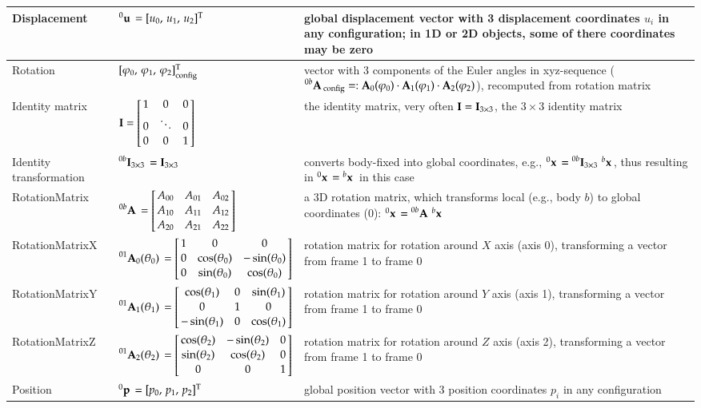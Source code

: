 \begin{center}
\begin{longtable}{| p{5cm} | p{5cm} | p{6cm} |}
    Displacement & $\prescript{0}{}{\mathbf{u}}\, = [u_0,\, u_1,\, u_2]^\mathrm{T}$ & global displacement vector with 3 displacement coordinates $u_i$ in any configuration; in 1D or 2D objects, some of there coordinates may be zero\\ \hline
Rotation & $[\varphi_0,\,\varphi_1,\,\varphi_2]^\mathrm{T}_\mathrm{config}$ & vector with 3 components of the Euler angles in xyz-sequence ($\prescript{0b}{}{\mathbf{A}}\,_\mathrm{config}=:\mathbf{A}_0(\varphi_0) \cdot \mathbf{A}_1(\varphi_1) \cdot \mathbf{A}_2(\varphi_2)$), recomputed from rotation matrix\\ \hline
    Identity matrix & $\Im = \mr{1}{0}{0} {0}{\ddots}{0} {0}{0}{1}$ & the identity matrix, very often $\mathbf{I} = \mathbf{I}_{3 \times 3}$, the $3 \times 3$ identity matrix \\ \hline
    Identity transformation & $\prescript{0b}{}{\mathbf{I}_{3 \times 3}}\, = \mathbf{I}_{3 \times 3}$ & converts body-fixed into global coordinates, e.g., $\prescript{0}{}{\mathbf{x}}\, = \prescript{0b}{}{\mathbf{I}_{3 \times 3}}\, \prescript{b}{}{\mathbf{x}}\,$, thus resulting in $\prescript{0}{}{\mathbf{x}}\, = \prescript{b}{}{\mathbf{x}}\,$ in this case\\ \hline
    RotationMatrix & $\LU{0b}{\Rot} = \mr{A_{00}}{A_{01}}{A_{02}} {A_{10}}{A_{11}}{A_{12}} {A_{20}}{A_{21}}{A_{22}}$ & a 3D rotation matrix, which transforms local (e.g., body $b$) to global coordinates (0): $\prescript{0}{}{\mathbf{x}}\, = \prescript{0b}{}{\mathbf{A}}\, \prescript{b}{}{\mathbf{x}}\,$\\ \hline
    RotationMatrixX & $\LU{01}{\Rot_0(\theta_0)} = 
		\mr{1}{0}{0} {0}{\cos(\theta_0)}{-\sin(\theta_0)} {0}{\sin(\theta_0)}{\cos(\theta_0)}$ & rotation matrix for rotation around $X$ axis (axis 0), transforming a vector from frame 1 to frame 0\\ \hline    
		RotationMatrixY & $\LU{01}{\Rot_1(\theta_1)} = 
		\mr{\cos(\theta_1)}{0}{\sin(\theta_1)} {0}{1}{0} {-\sin(\theta_1)}{0}{\cos(\theta_1)}$ & rotation matrix for rotation around $Y$ axis (axis 1), transforming a vector from frame 1 to frame 0\\ \hline    %
    RotationMatrixZ & $\LU{01}{\Rot_2(\theta_2)} = 
		\mr{\cos(\theta_2)}{-\sin(\theta_2)}{0} {\sin(\theta_2)}{\cos(\theta_2)}{0} {0}{0}{1}$ & rotation matrix for rotation around $Z$ axis (axis 2), transforming a vector from frame 1 to frame 0\\ \hline    
		Position & $\prescript{0}{}{\mathbf{p}}\, = [p_0,\, p_1,\, p_2]^\mathrm{T}$ & global position vector with 3 position coordinates $p_i$ in any configuration\\ \hline

\end{longtable}
\end{center}

